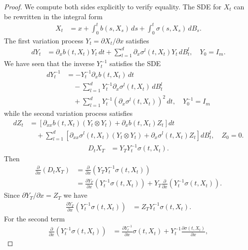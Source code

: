 \documentclass[]{interact}
\newcommand{\1}{\mathbf{1}}
\newcommand{\dt}{dt}
\theoremstyle{plain}%
\theoremstyle{definition}
\theoremstyle{remark}
\numberwithin{equation}{section}
\begin{document}
\begin{proof}
We compute both sides explicitly to verify equality. The SDE for $X_t$ can be rewritten in the integral form
\begin{align*}
X_t &= x + \int_0^t b(s, X_s) \, ds + \int_0^t \sigma(s, X_s) \, dB_s.
\end{align*}
The first variation process \(Y_t = \partial X_t/\partial x\) satisfies
\begin{align*}
dY_t &= \partial_x b(t, X_t) Y_t \, \dt + \sum_{l=1}^d \partial_x \sigma^l(t, X_t) Y_t \, dB_t^l, \quad Y_0 = I_m.
\end{align*}
We have seen that the inverse \(Y_t^{-1}\) satisfies the SDE 
\begin{align*}
dY_t^{-1} &= - Y_t^{-1} \partial_x b(t, X_t) \, dt \\
&\quad - \sum_{l=1}^d Y_t^{-1} \partial_x \sigma^l(t, X_t) \, dB_t^l \\
&\quad + \sum_{l=1}^d Y_t^{-1} \left( \partial_x \sigma^l(t, X_t) \right)^2 \, dt, \quad Y_0^{-1} = I_m
\end{align*}
while the second variation process satisfies
\begin{align*}
dZ_t &= \left[ \partial_{xx} b(t, X_t) (Y_t \otimes Y_t) + \partial_x b(t, X_t) Z_t \right] \dt \\
&\quad + \sum_{l=1}^d \left[ \partial_{xx} \sigma^l(t, X_t) (Y_t \otimes Y_t) + \partial_x \sigma^l(t, X_t) Z_t \right] dB_t^l, \quad Z_0 = 0.
\end{align*}
\begin{align*}
D_t X_T &= Y_T Y_t^{-1} \sigma(t, X_t).
\end{align*}
Then
\begin{align*}
\frac{\partial}{\partial x} (D_t X_T) &= \frac{\partial}{\partial x} \left( Y_T Y_t^{-1} \sigma(t, X_t) \right) \\
&= \frac{\partial Y_T}{\partial x} \left( Y_t^{-1} \sigma(t, X_t) \right) + Y_T \frac{\partial}{\partial x} \left( Y_t^{-1} \sigma(t, X_t) \right).
\end{align*}
Since \(\partial Y_T/\partial x = Z_T\) we have
\begin{align*}
\frac{\partial Y_T}{\partial x} \left( Y_t^{-1} \sigma(t, X_t) \right) &= Z_T Y_t^{-1} \sigma(t, X_t).
\end{align*}
For the second term
\begin{align*}
\frac{\partial}{\partial x} \left( Y_t^{-1} \sigma(t, X_t) \right) &= \frac{\partial Y_t^{-1}}{\partial x} \sigma(t, X_t) + Y_t^{-1} \frac{\partial \sigma(t, X_t)}{\partial x},

\end{align*}
\end{proof}
\end{document}
